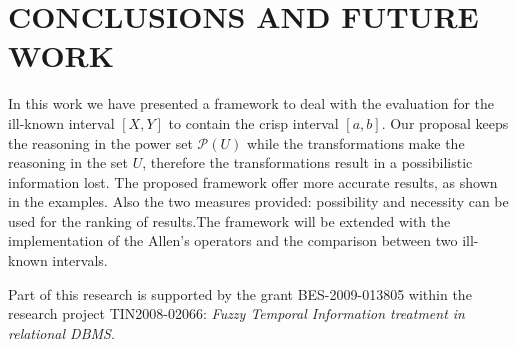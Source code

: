 \documentclass[twoside,twocolumn,a4paper]{article}
\newcommand{\Pow}{\mathcal{P}}
\begin{document}
\section{\label{sec:conclusions}CONCLUSIONS AND FUTURE WORK}
In this work we have presented a framework to deal with the evaluation for the ill-known interval $[X,Y]$ to contain the crisp interval $[a,b]$. Our proposal keeps the reasoning in the power set $\Pow(U)$ while the transformations make the reasoning in the set $U$, therefore the transformations result in a possibilistic information lost. The proposed framework offer more accurate results, as shown in the examples. Also the two measures provided: possibility and necessity can be used for the ranking of results.The framework will be extended with the implementation of the Allen's operators and the comparison between two ill-known intervals.
%
%
%
%
%
%


\begin{ack}
Part of this research is supported by the grant BES-2009-013805 within the research project TIN2008-02066: \emph{Fuzzy Temporal Information treatment in relational DBMS}.
\end{ack}



\end{document}
